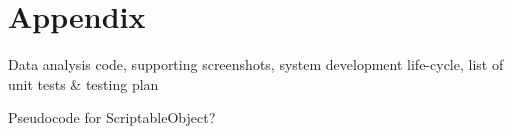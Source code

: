\section{Appendix}

Data analysis code, supporting screenshots, system development life-cycle, list of unit tests \& testing plan

Pseudocode for ScriptableObject?